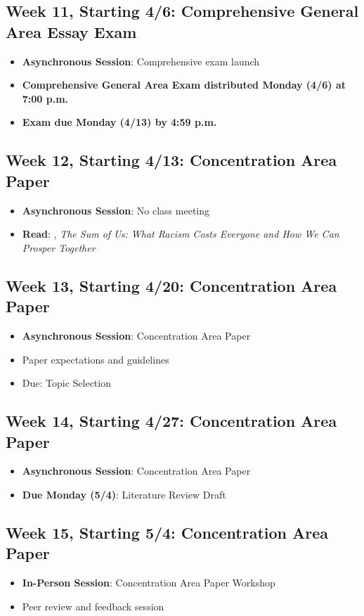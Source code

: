 \documentclass[11pt]{article}     %
\begin{document}
\subsection*{Week 11, Starting 4/6: Comprehensive General Area Essay Exam}
\begin{itemize}
    \item \textbf{Asynchronous Session}: Comprehensive exam launch 
    \item \textbf{Comprehensive General Area Exam distributed Monday (4/6) at 7:00 p.m.}
    \item \textbf{Exam due Monday (4/13) by 4:59 p.m.}
\end{itemize}

\subsection*{Week 12, Starting 4/13: Concentration Area Paper}
\begin{itemize}
    \item \textbf{Asynchronous Session}: No class meeting
    \item \textbf{Read}: \citet{mcghee2021}, \emph{The Sum of Us: What Racism Costs Everyone and How We Can Prosper Together}
\end{itemize}

\subsection*{Week 13, Starting 4/20: Concentration Area Paper}
\begin{itemize}
    \item \textbf{Asynchronous Session}: Concentration Area Paper
    \item Paper expectations and guidelines
    \item Due: Topic Selection
\end{itemize}

\subsection*{Week 14, Starting 4/27: Concentration Area Paper}
\begin{itemize}
    \item \textbf{Asynchronous Session}: Concentration Area Paper
    \item \textbf{Due Monday (5/4)}: Literature Review Draft
\end{itemize}

\subsection*{Week 15, Starting 5/4: Concentration Area Paper}
\begin{itemize}
    \item \textbf{In-Person Session}: Concentration Area Paper Workshop
    \item Peer review and feedback session
\end{itemize}
\end{document}
